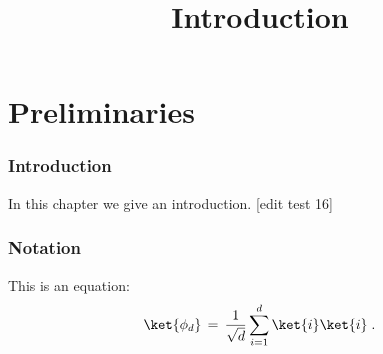 

%
\usepackage{marginnote}


\title{Introduction}
\hypertarget{0000}{}
\reversemarginpar{}
\label{introduction}


\maketitle


\tableofcontents

\part{Preliminaries}
\hypertarget{0001}{}
\reversemarginpar{}
\label{book-part-preliminaries}

\section{Introduction}

In this chapter we give an introduction. [edit test 16]

\section{Notation}

This is an equation:
\begin{equation}
\label{eq:me-state}
 \ket{\phi_d} \,=\,\frac{1}{\sqrt{d}} \sum_{i=1}^d \ket{i}\ket{i}\;.
\end{equation}








